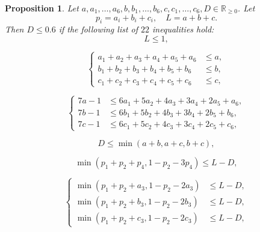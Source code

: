 \documentclass[10pt,a4paper]{amsart}
\newtheorem{prop}{Proposition}
\newcommand\RR{\mathbb{R}}
\renewcommand{\geq}{\geqslant}
\renewcommand{\le}{\leqslant}
\begin{document}
\begin{prop}\label{prop:linear_program}
    Let $a,a_1,\dots,a_6,b,b_1,\dots,b_6,c,c_1,\dots,c_6,D \in \RR_{\geq 0}$. Let  
    $$
    p_i=a_i+b_i+c_i, \quad L=a+b+c. 
     $$
 Then $D \le 0.6$ if the  following list of $22$ inequalities hold:
    \begin{equation}\label{eq:1}
            L \le 1,
    \end{equation}

\medskip

    \begin{equation}\label{eq:2}
\left\{
\begin{aligned}
a_1+a_2+a_3+a_4+a_5+a_6 &\le a,\\
b_1+b_2+b_3+b_4+b_5+b_6 &\le b,\\
c_1+c_2+c_3+c_4+c_5+c_6 &\le c,
\end{aligned}
\right.
\end{equation}

\medskip

\begin{equation}\label{eq:3}
\left\{
\begin{aligned}
        7a-1 &\le 6a_1+5a_2+4a_3+3a_4+2a_5+a_6,\\
        7b-1 &\le 6b_1+5b_2+4b_3+3b_4+2b_5+b_6,\\
        7c-1 &\le 6c_1+5c_2+4c_3+3c_4+2c_5+c_6,
\end{aligned}
\right.
\end{equation}

\medskip

        \begin{equation}\label{eq:4}
        D \le \min(a+b,a+c,b+c),
    \end{equation}

\medskip

\begin{equation}\label{eq:5}
       \min(p_1+p_2+p_4,1-p_2-3p_4) \le L-D,
    \end{equation}

\medskip

\begin{equation}\label{eq:6}
\left\{
\begin{aligned}
        \min(p_1+p_2+a_3,1-p_2-2a_3) &\le L-D,\\
        \min(p_1+p_2+b_3,1-p_2-2b_3) &\le L-D,\\
        \min(p_1+p_2+c_3,1-p_2-2c_3) &\le L-D,
\end{aligned}
\right.
\end{equation}


\end{prop}
\end{document}

